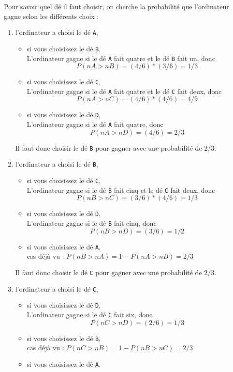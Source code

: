\documentclass[a4paper,11pt]{book}
\begin{document}
Pour savoir quel d\'e il faut choisir, on cherche la probabilit\'e
que l'ordinateur gagne selon les diff\'erents choix :
\begin{enumerate}
\item l'ordinateur a choisi le d\'e {\tt A},
\begin{itemize}
\item si vous choisissez le d\'e {\tt B},\\
L'ordinateur gagne si le d\'e {\tt A} fait quatre et le d\'e {\tt B} fait un,
donc 
$$P(nA>nB)=(4/6)*(3/6)=1/3$$
\item si vous choisissez le d\'e {\tt C},\\
L'ordinateur gagne si le d\'e {\tt A} fait quatre et le d\'e {\tt C} fait deux,
donc 
$$P(nA>nC)=(4/6)*(4/6)=4/9$$ 
\item si vous choisissez le d\'e {\tt D},\\
L'ordinateur gagne si le d\'e {\tt A} fait quatre, donc 
$$P(nA>nD)=(4/6)=2/3$$ 
\end{itemize}
Il faut donc choisir le d\'e {\tt B} pour gagner avec une probabilit\'e de 2/3.
\item l'ordinateur a choisi le d\'e {\tt B},
\begin{itemize}
\item si vous choisissez le d\'e {\tt C},\\
L'ordinateur gagne si le d\'e {\tt B} fait cinq et le d\'e {\tt C} fait deux,
donc 
$$P(nB>nC)=(3/6)*(4/6)=1/3$$ 
\item si vous choisissez le d\'e {\tt D},\\
L'ordinateur gagne si le d\'e {\tt B} fait cinq,
donc 
$$P(nB>nD)=(3/6)=1/2$$ 
\item si vous choisissez le d\'e {\tt A},\\
cas d\'ej\`a vu :
$P(nB>nA)=1-P(nA>nB)=2/3$
\end{itemize}
Il faut donc choisir le d\'e {\tt C} pour gagner avec une probabilit\'e de 2/3.
\item l'ordinateur a choisi le d\'e {\tt C},
\begin{itemize}
\item si vous choisissez le d\'e {\tt D},\\
L'ordinateur gagne si le d\'e {\tt C} fait six,
donc 
$$P(nC>nD)=(2/6)=1/3 $$
\item si vous choisissez le d\'e {\tt B},\\
cas d\'ej\`a vu :
$ P(nC>nB)=1-P(nB>nC)=2/3$
\item si vous choisissez le d\'e {\tt A},\\

\end{itemize}
\end{enumerate}
\end{document}
